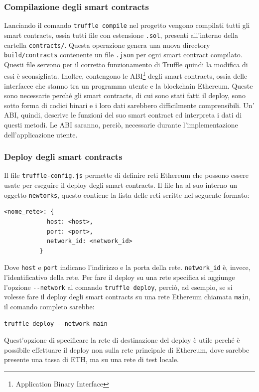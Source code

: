 \documentclass[a4paper]{article}
\begin{document}
        \subsubsection{Compilazione degli smart contracts}
        \label{trufflecompile}
        Lanciando il comando \verb|truffle compile| nel progetto vengono compilati tutti gli smart contracts, ossia tutti file con estensione \verb|.sol|, presenti all'interno della cartella \verb|contracts/|.
        Questa operazione genera una nuova directory \verb|build/contracts| contenente un file \verb|.json| per ogni smart contract compilato. Questi file servono per il corretto funzionamento di Truffle quindi la modifica di essi è sconsigliata.
        Inoltre, contengono le ABI\footnote{Application Binary Interface} degli smart contracts, ossia delle interfacce che stanno tra un programma utente e la blockchain Ethereum. Queste sono necessarie perché gli smart contracts, di cui sono stati fatti il deploy, sono sotto forma
        di codici binari e i loro dati sarebbero difficilmente comprensibili. Un' ABI, quindi, descrive le funzioni del suo smart contract ed interpreta i dati di questi metodi. Le  ABI saranno, perciò, necessarie durante l'implementazione dell'applicazione utente.
        \subsubsection{Deploy degli smart contracts}
        Il file \verb|truffle-config.js| permette di definire reti Ethereum che possono essere usate per eseguire il deploy degli smart contracts. Il file ha al suo interno un oggetto \verb|newtorks|, questo contiene la lista delle reti scritte nel seguente formato:
        \begin{lstlisting}[style=ES6, title={Esempio di definizione di una rete Ethereum}]
          <nome_rete>: {
            host: <host>,
            port: <port>,
            network_id: <network_id>
          }\end{lstlisting}
        Dove \verb|host| e \verb|port| indicano l'indirizzo e la porta della rete. \verb|network_id| è, invece, l'identificativo della rete.
        \newline
        Per fare il deploy su una rete specifica si aggiunge l'opzione \verb|--network| al comando \verb|truffle deploy|, perciò, ad esempio,
        se si volesse fare il deploy degli smart contracts su una rete Ethereum chiamata \verb|main|, il comando completo sarebbe:
        \begin{lstlisting}[style=ES6, title={Esempio di deploy specificando la rete}]
          truffle deploy --network main\end{lstlisting}
        Quest'opzione di specificare la rete di destinazione del deploy è utile perché è possibile effettuare il deploy non sulla rete principale di Ethereum, dove sarebbe presente una tassa di ETH, ma su una rete di test locale. 
\end{document}
